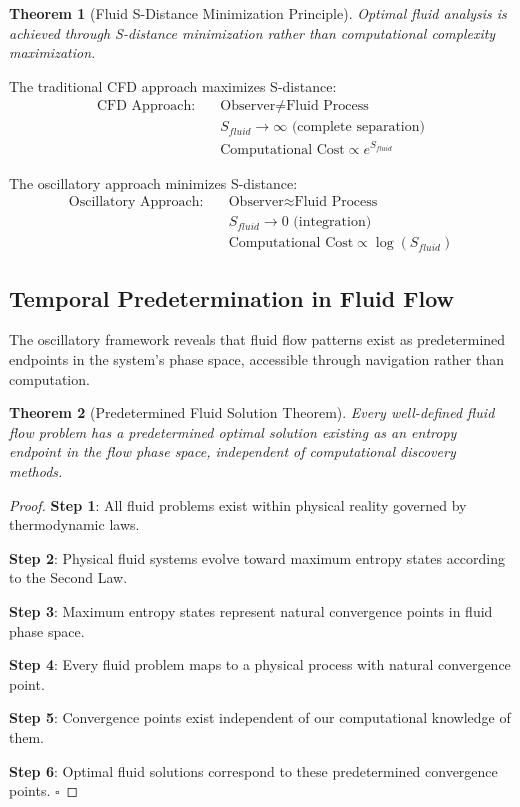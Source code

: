 \documentclass[12pt,a4paper]{article}
\newtheorem{theorem}{Theorem}
\begin{document}
\begin{theorem}[Fluid S-Distance Minimization Principle]
Optimal fluid analysis is achieved through S-distance minimization rather than computational complexity maximization.
\end{theorem}

The traditional CFD approach maximizes S-distance:
\begin{align}
\text{CFD Approach}: \quad &\text{Observer} \neq \text{Fluid Process} \\
&S_{fluid} \to \infty \text{ (complete separation)} \\
&\text{Computational Cost} \propto e^{S_{fluid}}
\end{align}

The oscillatory approach minimizes S-distance:
\begin{align}
\text{Oscillatory Approach}: \quad &\text{Observer} \approx \text{Fluid Process} \\
&S_{fluid} \to 0 \text{ (integration)} \\
&\text{Computational Cost} \propto \log(S_{fluid})
\end{align}

\subsection{Temporal Predetermination in Fluid Flow}

The oscillatory framework reveals that fluid flow patterns exist as predetermined endpoints in the system's phase space, accessible through navigation rather than computation.

\begin{theorem}[Predetermined Fluid Solution Theorem]
Every well-defined fluid flow problem has a predetermined optimal solution existing as an entropy endpoint in the flow phase space, independent of computational discovery methods.
\end{theorem}

\begin{proof}
\textbf{Step 1}: All fluid problems exist within physical reality governed by thermodynamic laws.

\textbf{Step 2}: Physical fluid systems evolve toward maximum entropy states according to the Second Law.

\textbf{Step 3}: Maximum entropy states represent natural convergence points in fluid phase space.

\textbf{Step 4}: Every fluid problem maps to a physical process with natural convergence point.

\textbf{Step 5}: Convergence points exist independent of our computational knowledge of them.

\textbf{Step 6}: Optimal fluid solutions correspond to these predetermined convergence points. $\square$
\end{proof}
\end{document}
